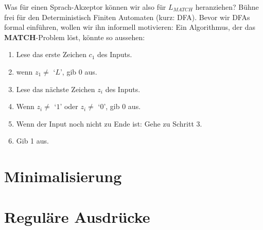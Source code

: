 Was für einen Sprach-Akzeptor können wir also für $L_{MATCH}$ heranziehen?
Bühne frei für den Deterministisch Finiten Automaten (kurz: DFA).
Bevor wir DFAs formal einführen, wollen wir ihn informell motivieren: 
Ein Algorithmus, der das \textbf{MATCH}-Problem löst, könnte so aussehen:
\begin{enumerate}
    \item Lese das erste Zeichen $c_1$ des Inputs.
    \item wenn $z_1 \neq $ `$L$', gib 0 aus.
    \item Lese das nächste Zeichen $z_i$ des Inputs.
    \item Wenn $z_i \neq $ `$1$' oder $z_i \neq $ `$0$', gib 0 aus.
    \item Wenn der Input noch nicht zu Ende ist: Gehe zu Schritt 3.
    \item Gib 1 aus.
\end{enumerate}
\section{Minimalisierung}
\section{Reguläre Ausdrücke}


